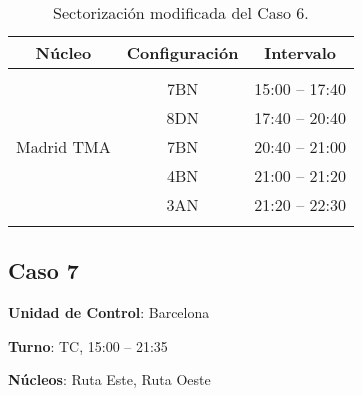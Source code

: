 \begin{table}[h]
	\centering
	\caption{Sectorización modificada del Caso 6.}
	\label{table:D:caso6-modif}
	\begin{tabular}{ccc}
		\hline
		\multicolumn{1}{c}{\textbf{Núcleo}}              & \multicolumn{1}{c}{\textbf{Configuración}} & \multicolumn{1}{c}{\textbf{Intervalo}} \\ \hline
		&                                            &                                        \\
		\multicolumn{1}{l|}{\multirow{5}{*}{Madrid TMA}} & 7BN                                        & 15:00 -- 17:40                         \\
		\multicolumn{1}{l|}{}                            & 8DN                                        & 17:40 -- 20:40                         \\
		\multicolumn{1}{l|}{}                            & 7BN                                        & 20:40 -- 21:00                         \\
		\multicolumn{1}{l|}{}                            & 4BN                                        & 21:00 -- 21:20                         \\
		\multicolumn{1}{l|}{}                            & 3AN                                        & 21:20 -- 22:30                         \\
		\multicolumn{1}{c}{}                             &                                            &                                        \\ \hline
	\end{tabular}
\end{table}


\subsection{Caso 7}

\textbf{Unidad de Control}: Barcelona

\textbf{Turno}: TC, 15:00 -- 21:35


\textbf{Núcleos}: Ruta Este, Ruta Oeste

